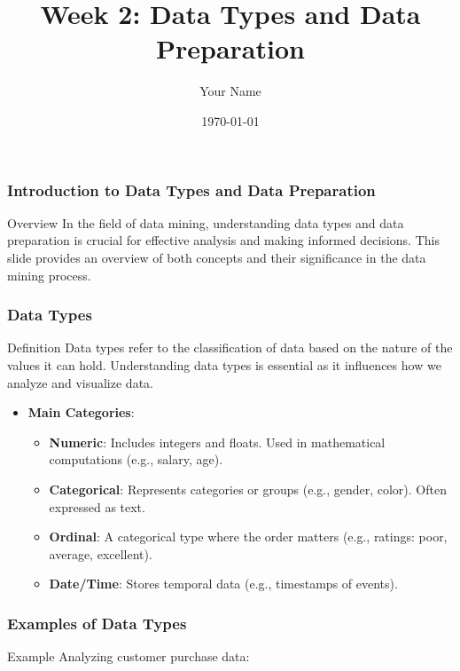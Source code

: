 \documentclass{beamer}
\title{Week 2: Data Types and Data Preparation}
\author{Your Name}
\institute{Your Institution}
\date{\today}
\begin{document}
\frame{\titlepage}

\begin{frame}[fragile]
    \frametitle{Introduction to Data Types and Data Preparation}
    \begin{block}{Overview}
        In the field of data mining, understanding data types and data preparation is crucial for effective analysis and making informed decisions. This slide provides an overview of both concepts and their significance in the data mining process.
    \end{block}
\end{frame}

\begin{frame}[fragile]
    \frametitle{Data Types}
    \begin{block}{Definition}
        Data types refer to the classification of data based on the nature of the values it can hold. Understanding data types is essential as it influences how we analyze and visualize data.
    \end{block}

    \begin{itemize}
        \item \textbf{Main Categories}:
        \begin{itemize}
            \item \textbf{Numeric}: Includes integers and floats. Used in mathematical computations (e.g., salary, age).
            \item \textbf{Categorical}: Represents categories or groups (e.g., gender, color). Often expressed as text.
            \item \textbf{Ordinal}: A categorical type where the order matters (e.g., ratings: poor, average, excellent).
            \item \textbf{Date/Time}: Stores temporal data (e.g., timestamps of events).
        \end{itemize}
    \end{itemize}
\end{frame}

\begin{frame}[fragile]
    \frametitle{Examples of Data Types}
    \begin{block}{Example}
        Analyzing customer purchase data:
    \end{block}
\end{frame}
\end{document}
